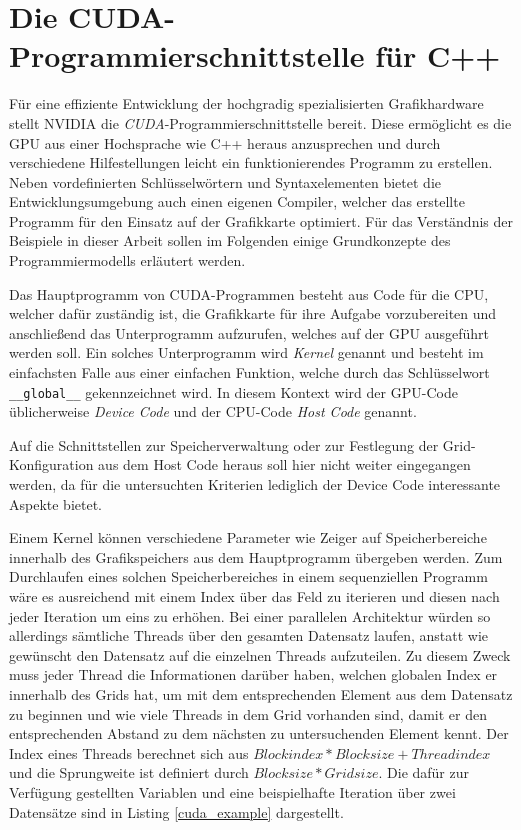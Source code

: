 \section{Die CUDA-Programmierschnittstelle für C++}

Für eine effiziente Entwicklung der hochgradig spezialisierten Grafikhardware stellt NVIDIA die \emph{CUDA}-Programmierschnittstelle bereit.
Diese ermöglicht es die GPU aus einer Hochsprache wie C++ heraus anzusprechen und durch verschiedene Hilfestellungen leicht ein funktionierendes Programm zu erstellen.
Neben vordefinierten Schlüsselwörtern und Syntaxelementen bietet die Entwicklungsumgebung auch einen eigenen Compiler, welcher das erstellte Programm für den Einsatz auf der Grafikkarte optimiert.
Für das Verständnis der Beispiele in dieser Arbeit sollen im Folgenden einige Grundkonzepte des Programmiermodells erläutert werden.

Das Hauptprogramm von CUDA-Programmen besteht aus Code für die CPU, welcher dafür zuständig ist, die Grafikkarte für ihre Aufgabe vorzubereiten und anschließend das Unterprogramm aufzurufen, welches auf der GPU ausgeführt werden soll.
Ein solches Unterprogramm wird \emph{Kernel} genannt und besteht im einfachsten Falle aus einer einfachen Funktion, welche durch das Schlüsselwort \texttt{\_\_global\_\_} gekennzeichnet wird.
In diesem Kontext wird der GPU-Code üblicherweise \emph{Device Code} und der CPU-Code \emph{Host Code} genannt.

Auf die Schnittstellen zur Speicherverwaltung oder zur Festlegung der Grid-Konfiguration aus dem Host Code heraus soll hier nicht weiter eingegangen werden, da für die untersuchten Kriterien lediglich der Device Code interessante Aspekte bietet.

Einem Kernel können verschiedene Parameter wie Zeiger auf Speicherbereiche innerhalb des Grafikspeichers aus dem Hauptprogramm übergeben werden.
Zum Durchlaufen eines solchen Speicherbereiches in einem sequenziellen Programm wäre es ausreichend mit einem Index über das Feld zu iterieren und diesen nach jeder Iteration um eins zu erhöhen.
Bei einer parallelen Architektur würden so allerdings sämtliche Threads über den gesamten Datensatz laufen, anstatt wie gewünscht den Datensatz auf die einzelnen Threads aufzuteilen.
Zu diesem Zweck muss jeder Thread die Informationen darüber haben, welchen globalen Index er innerhalb des Grids hat, um mit dem entsprechenden Element aus dem Datensatz zu beginnen und wie viele Threads in dem Grid vorhanden sind, damit er den entsprechenden Abstand zu dem nächsten zu untersuchenden Element kennt.
Der Index eines Threads berechnet sich aus $Blockindex * Blocksize + Threadindex$ und die Sprungweite ist definiert durch $Blocksize * Gridsize$.
Die dafür zur Verfügung gestellten Variablen und eine beispielhafte Iteration über zwei Datensätze sind in Listing \ref{cuda_example} dargestellt.

